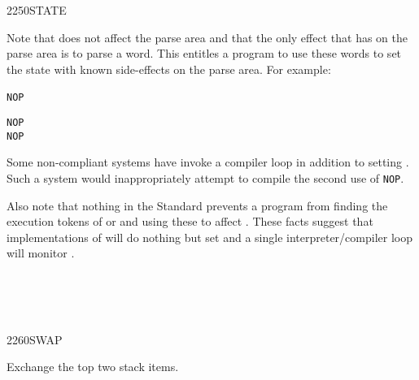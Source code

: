 \begin{worddef}{2250}{STATE}
\begin{rationale}
		Note that \word{]} does not affect the parse area and that the
		only effect that \word{:} has on the parse area is to parse a
		word. This entitles a program to use these words to set the
		state with known side-effects on the parse area. For example:

		\tab \word{:} \texttt{NOP}~
			\word{:}  \word{;} 
		\word{;}

		\tab \texttt{NOP}  \\
		\tab \texttt{NOP} 

		Some non-compliant systems have \word{]} invoke a
		compiler loop in addition to setting . Such a
		system would inappropriately attempt to compile the second
		use of \texttt{NOP}.

		Also note that nothing in the Standard prevents a program from
		finding the execution tokens of \word{]} or \word{[} and using
		these to affect . These facts suggest that
		implementations of \word{]} will do nothing but set 
		and a single interpreter/compiler loop will monitor .
	\end{rationale}

	\begin{testing} %
		 \\
		 \\
		 \\
	\end{testing}
\end{worddef}


\begin{worddef}{2260}{SWAP}
\item {}

	Exchange the top two stack items.

	\begin{testing} %
	\end{testing}
\end{worddef}


